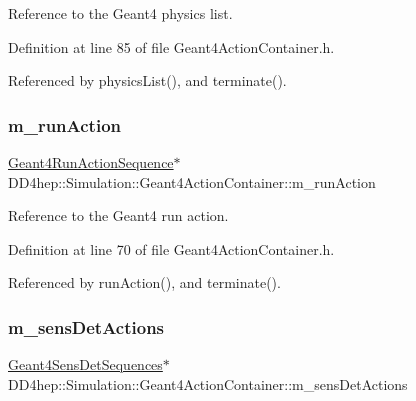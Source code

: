 Reference to the Geant4 physics list. 



Definition at line 85 of file Geant4\+Action\+Container.\+h.



Referenced by physics\+List(), and terminate().

\hypertarget{class_d_d4hep_1_1_simulation_1_1_geant4_action_container_a627339c1dc5e85a432170b010abd3505}{}\label{class_d_d4hep_1_1_simulation_1_1_geant4_action_container_a627339c1dc5e85a432170b010abd3505} 
\subsubsection{\texorpdfstring{m\+\_\+run\+Action}{m\_runAction}}
{\footnotesize\ttfamily \hyperlink{class_d_d4hep_1_1_simulation_1_1_geant4_run_action_sequence}{Geant4\+Run\+Action\+Sequence}$\ast$ D\+D4hep\+::\+Simulation\+::\+Geant4\+Action\+Container\+::m\+\_\+run\+Action\hspace{0.3cm}{\ttfamily [protected]}}



Reference to the Geant4 run action. 



Definition at line 70 of file Geant4\+Action\+Container.\+h.



Referenced by run\+Action(), and terminate().

\hypertarget{class_d_d4hep_1_1_simulation_1_1_geant4_action_container_ae9a092ff4aa75024c19b392f227abdef}{}\label{class_d_d4hep_1_1_simulation_1_1_geant4_action_container_ae9a092ff4aa75024c19b392f227abdef} 
\subsubsection{\texorpdfstring{m\+\_\+sens\+Det\+Actions}{m\_sensDetActions}}
{\footnotesize\ttfamily \hyperlink{class_d_d4hep_1_1_simulation_1_1_geant4_sens_det_sequences}{Geant4\+Sens\+Det\+Sequences}$\ast$ D\+D4hep\+::\+Simulation\+::\+Geant4\+Action\+Container\+::m\+\_\+sens\+Det\+Actions\hspace{0.3cm}{\ttfamily [protected]}}



